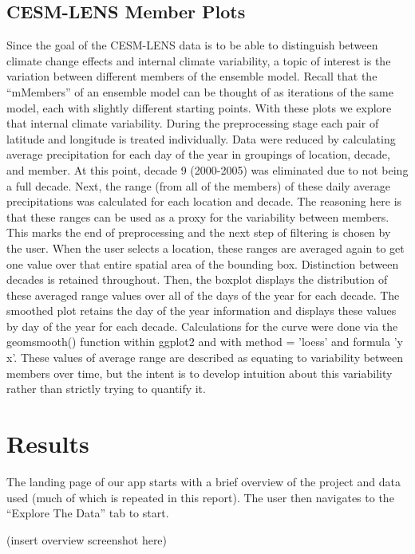 \documentclass[10pt,letterpaper]{article}
\begin{document}
\subsection*{CESM-LENS Member Plots}

Since the goal of the CESM-LENS data is to be able to distinguish between climate change effects and internal climate variability, a topic of interest is the variation between different members of the ensemble model. Recall that the “mMembers” of an ensemble model can be thought of as iterations of the same model, each with slightly different starting points. With these plots we explore that internal climate variability.
During the preprocessing stage each pair of latitude and longitude is treated individually. Data were reduced by calculating average precipitation for each day of the year in groupings of location, decade, and member. At this point,  decade 9 (2000-2005) was eliminated due to not being a full decade. Next, the range (from all of the members) of these daily average precipitations was calculated for each location and  decade. The reasoning here is that these ranges can be used as a proxy for the variability between members. This marks the end of preprocessing and the next step of filtering is chosen by the user.
When the user selects a location, these ranges are averaged again to get one value over that entire spatial area of the bounding box. Distinction between decades is retained throughout. Then, the boxplot displays the distribution of these averaged range values over all of the days of the year for each decade. The smoothed plot retains the day of the year information and displays these values by day of the year for each decade. Calculations for the curve were done via the geomsmooth() function within ggplot2 and with method = 'loess' and formula 'y  x'. These values of average range are described as equating to variability between members over time, but the intent is to develop intuition about this variability rather than strictly trying to quantify it.




\section*{Results}

The landing page of our app starts with a brief overview of the project and data used (much of which is repeated in this report). The user then navigates to the “Explore The Data” tab to start.

(insert overview screenshot here)
\end{document}
